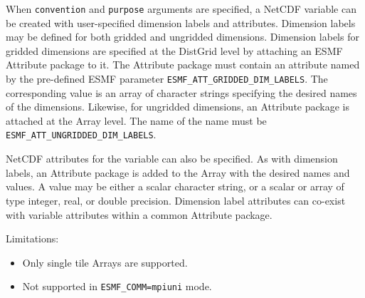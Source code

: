      When {\tt convention} and {\tt purpose} arguments are specified,
     a NetCDF variable can be created with user-specified dimension labels and
     attributes.  Dimension labels may be defined for both gridded and
     ungridded dimensions.  Dimension labels for gridded dimensions are specified
     at the DistGrid level by attaching an ESMF Attribute package to it.  The Attribute
     package must contain an attribute named by the pre-defined ESMF parameter
     {\tt ESMF\_ATT\_GRIDDED\_DIM\_LABELS}.  The corresponding value is an array of
     character strings specifying the desired names of the dimensions.  Likewise,
     for ungridded dimensions, an Attribute package is attached at the Array level.
     The name of the name must be {\tt ESMF\_ATT\_UNGRIDDED\_DIM\_LABELS}.
  
     NetCDF attributes for the variable can also be specified.  As with dimension labels,
     an Attribute package is added to the Array with the desired names and values.
     A value may be either a scalar character string, or a scalar or array of type
     integer, real, or double precision.  Dimension label attributes can co-exist with
     variable attributes within a common Attribute package.
  
     Limitations:
     \begin{itemize}
       \item Only single tile Arrays are supported.
       \item Not supported in {\tt ESMF\_COMM=mpiuni} mode.
     \end{itemize}
  
